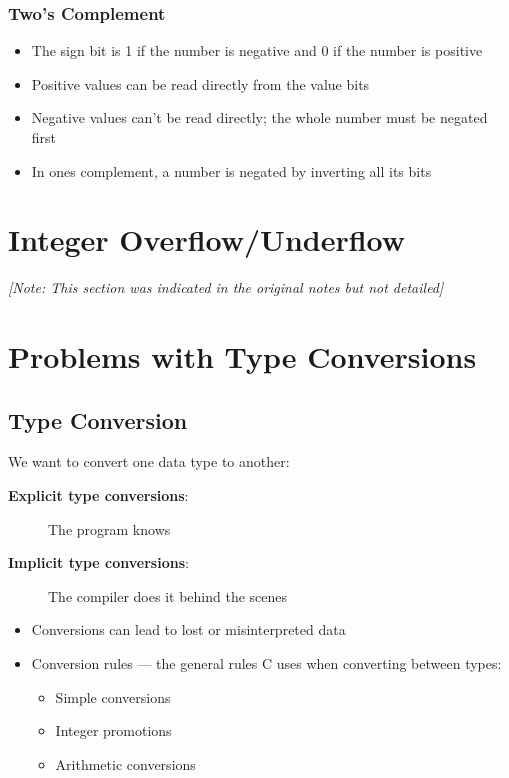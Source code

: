 \documentclass[11pt,a4paper]{article}
\begin{document}
\subsubsection{Two's Complement}
\begin{itemize}
    \item The sign bit is 1 if the number is negative and 0 if the number is positive
    \item Positive values can be read directly from the value bits
    \item Negative values can't be read directly; the whole number must be negated first
    \item In ones complement, a number is negated by inverting all its bits
\end{itemize}

\section{Integer Overflow/Underflow}

\textit{[Note: This section was indicated in the original notes but not detailed]}

\section{Problems with Type Conversions}

\subsection{Type Conversion}

We want to convert one data type to another:

\begin{description}
    \item[\textbf{Explicit type conversions}:] The program knows
    \item[\textbf{Implicit type conversions}:] The compiler does it behind the scenes
\end{description}

\begin{itemize}
    \item Conversions can lead to lost or misinterpreted data
    \item Conversion rules --- the general rules C uses when converting between types:
    \begin{itemize}
        \item Simple conversions
        \item Integer promotions
        \item Arithmetic conversions
    \end{itemize}
\end{itemize}
\end{document}
